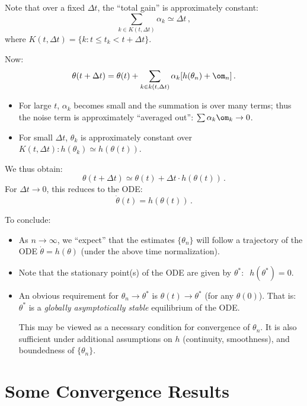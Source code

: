 Note that over a fixed $\Delta t$, the ``total gain'' is approximately
constant:
$$
\sum_{k\in K(t, \Delta t)} \alpha_k \simeq \Delta t\,,
$$
where $K(t,\Delta t) = \{k: t \le t_k < t+ \Delta t\}$.

Now:
$$
\theta(t+\Delta t) = \theta(t) + \sum_{k\in k(t, \Delta t)} \alpha_k [h(\theta_n)
+\om_n] \,.
$$
\begin{itemize}
\item
For large $t$, $\alpha_k$ becomes small and the summation is over many
terms; thus the noise term is approximately ``averaged out'':
$\sum \alpha_k \om_k \to 0$.
\item
For small $\Delta t$, $\theta_k$ is approximately constant over $K(t, \Delta t):
h(\theta_k) \simeq h(\theta(t))$.
\end{itemize}
We thus obtain:
$$
\theta(t+\Delta t) \simeq \theta(t) +\Delta t\cdot h (\theta(t))\,.
$$
For $\Delta t \to 0$, this reduces to the ODE:
$$
\dot \theta(t) = h(\theta(t))\,.
$$

\medskip

To conclude:
\begin{itemize}
\item
As $n\to\infty$, we ``expect'' that the estimates
$\{\theta_n\}$ will follow a trajectory of the ODE $\dot\theta=h(\theta)$
(under the above time normalization).
\item
Note that the stationary point(s) of the ODE are given by
$\theta^*:\;\; h(\theta^*) = 0$.
\item
An obvious requirement for $\theta_n \to \theta^*$ is
$\theta(t) \to \theta^*$
(for any $\theta(0)$).
That is: $\theta^*$ is a {\em globally asymptotically stable} equilibrium of
the ODE.

This may be viewed as a necessary condition for convergence of
$\theta_n$. It is also sufficient under additional assumptions on
$h$ (continuity, smoothness), and boundedness of $\{\theta_n\}$.
\end{itemize}



\section{Some Convergence Results}

